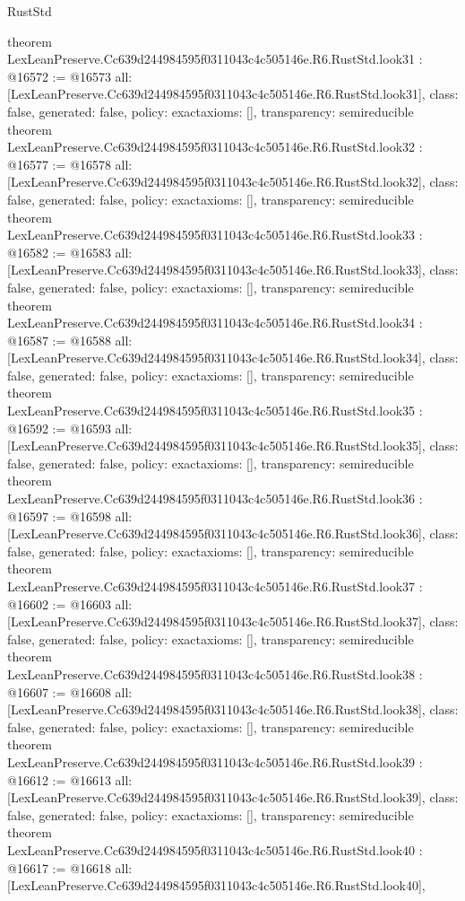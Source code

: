 \begin{lexlean}{RustStd}
\begin{coremodule}
{}
theorem LexLeanPreserve.Cc639d244984595f0311043c4c505146e.R6.RustStd.look31 : @16572 := @16573 {
  all: [LexLeanPreserve.Cc639d244984595f0311043c4c505146e.R6.RustStd.look31],
  class: false,
  generated: false,
  policy: exact{axioms: []},
  transparency: semireducible
}
theorem LexLeanPreserve.Cc639d244984595f0311043c4c505146e.R6.RustStd.look32 : @16577 := @16578 {
  all: [LexLeanPreserve.Cc639d244984595f0311043c4c505146e.R6.RustStd.look32],
  class: false,
  generated: false,
  policy: exact{axioms: []},
  transparency: semireducible
}
theorem LexLeanPreserve.Cc639d244984595f0311043c4c505146e.R6.RustStd.look33 : @16582 := @16583 {
  all: [LexLeanPreserve.Cc639d244984595f0311043c4c505146e.R6.RustStd.look33],
  class: false,
  generated: false,
  policy: exact{axioms: []},
  transparency: semireducible
}
theorem LexLeanPreserve.Cc639d244984595f0311043c4c505146e.R6.RustStd.look34 : @16587 := @16588 {
  all: [LexLeanPreserve.Cc639d244984595f0311043c4c505146e.R6.RustStd.look34],
  class: false,
  generated: false,
  policy: exact{axioms: []},
  transparency: semireducible
}
theorem LexLeanPreserve.Cc639d244984595f0311043c4c505146e.R6.RustStd.look35 : @16592 := @16593 {
  all: [LexLeanPreserve.Cc639d244984595f0311043c4c505146e.R6.RustStd.look35],
  class: false,
  generated: false,
  policy: exact{axioms: []},
  transparency: semireducible
}
theorem LexLeanPreserve.Cc639d244984595f0311043c4c505146e.R6.RustStd.look36 : @16597 := @16598 {
  all: [LexLeanPreserve.Cc639d244984595f0311043c4c505146e.R6.RustStd.look36],
  class: false,
  generated: false,
  policy: exact{axioms: []},
  transparency: semireducible
}
theorem LexLeanPreserve.Cc639d244984595f0311043c4c505146e.R6.RustStd.look37 : @16602 := @16603 {
  all: [LexLeanPreserve.Cc639d244984595f0311043c4c505146e.R6.RustStd.look37],
  class: false,
  generated: false,
  policy: exact{axioms: []},
  transparency: semireducible
}
theorem LexLeanPreserve.Cc639d244984595f0311043c4c505146e.R6.RustStd.look38 : @16607 := @16608 {
  all: [LexLeanPreserve.Cc639d244984595f0311043c4c505146e.R6.RustStd.look38],
  class: false,
  generated: false,
  policy: exact{axioms: []},
  transparency: semireducible
}
theorem LexLeanPreserve.Cc639d244984595f0311043c4c505146e.R6.RustStd.look39 : @16612 := @16613 {
  all: [LexLeanPreserve.Cc639d244984595f0311043c4c505146e.R6.RustStd.look39],
  class: false,
  generated: false,
  policy: exact{axioms: []},
  transparency: semireducible
}
theorem LexLeanPreserve.Cc639d244984595f0311043c4c505146e.R6.RustStd.look40 : @16617 := @16618 {
  all: [LexLeanPreserve.Cc639d244984595f0311043c4c505146e.R6.RustStd.look40],
}
\end{coremodule}
\end{lexlean}
